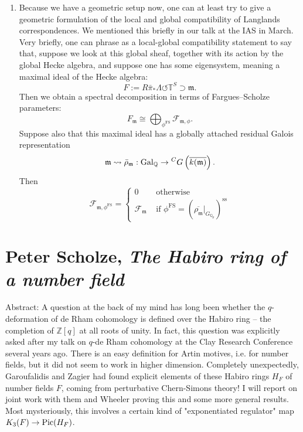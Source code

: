 \documentclass[reqno]{amsart} 
\begin{document}
\begin{enumerate}
\item\label{enumerate:cnpplsslhs} Because we have a geometric setup now, one can at least try to give a geometric formulation of the local and global compatibility of Langlands correspondences.  We mentioned this briefly in our talk at the IAS in March.  Very briefly, one can phrase as a local-global compatibility statement to say that, suppose we look at this global sheaf, together with its action by the global Hecke algebra, and suppose one has some eigensystem, meaning a maximal ideal of the Hecke algebra:
  \begin{equation*}
    F := R \bar{\pi}_\ast \Lambda \circlearrowleft \mathbb{T}^S \supset \mathfrak{m}.
  \end{equation*}
  Then we obtain a spectral decomposition in terms of Fargues--Scholze parameters:
  \begin{equation*}
    F_{\mathfrak{m}} \cong \bigoplus_{\phi^{\mathrm{F S}}} \mathcal{F}_{\mathfrak{m}, \phi}.
  \end{equation*}
  Suppose also that this maximal ideal has a globally attached residual Galois representation
  \begin{equation*}
    \mathfrak{m} \rightsquigarrow \bar{\rho}_{\mathfrak{m}} : \operatorname{Gal}_{\mathbb{Q}}
    \rightarrow {}^C G \left( \overline{k(\mathfrak{m})} \right).
  \end{equation*}
  Then
  \begin{equation*}
    \mathcal{F}_{\mathfrak{m}, \phi^{\mathrm{F S}}} =
    \begin{cases}
      0 &\text{ otherwise}  \\
      \mathcal{F}_{\mathfrak{m}}        &  \text{ if } \phi^{\mathrm{F S}}
                                          = (\overline{\rho_{\mathfrak{m}}} |_{G_{\mathbb{Q}_p}})^{\mathrm{ss}}
    \end{cases}
  \end{equation*}
\end{enumerate}

\part{Peter Scholze, \emph{The Habiro ring of a number field}}

Abstract: A question at the back of my mind has long been whether the $q$-deformation of de Rham cohomology is defined over the Habiro ring -- the completion of $\mathbb{Z}[q]$ at all roots of unity. In fact, this question was explicitly asked after my talk on $q$-de Rham cohomology at the Clay Research Conference several years ago. There is an easy definition for Artin motives, i.e. for number fields, but it did not seem to work in higher dimension. Completely unexpectedly, Garoufalidis and Zagier had found explicit elements of these Habiro rings $H_F$ of number fields $F$, coming from perturbative Chern-Simons theory! I will report on joint work with them and Wheeler proving this and some more general results. Most mysteriously, this involves a certain kind of "exponentiated regulator" map $K_3(F) \rightarrow \operatorname{Pic}(H_F)$.
\end{document}
